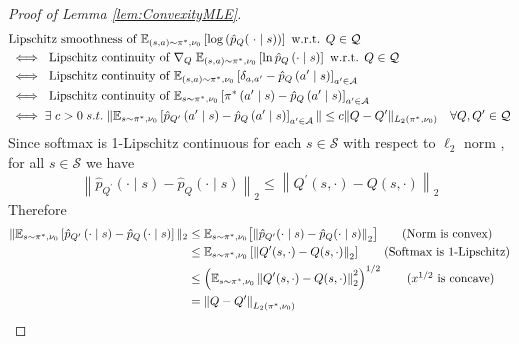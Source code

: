 \begin{proof}[Proof of Lemma \ref{lem:ConvexityMLE}]
\begin{align}
    &\text{Lipschitz} \text{ smoothness } \text{of }  \mathbb{E}_{(s, a)\sim \pi^*, \nu_0}  \left[\log\left(\hat{p}_{Q}(\;\cdot
    \mid s)\right)\right] \text{ w.r.t. }Q\in\mathcal{Q}\notag
    \\
    &\iff \text{ Lipschitz continuity of } \nabla_Q \; \mathbb{E}_{(s,a)\sim\pi^*, \nu_0}\left[\ln \hat{p}_{Q}\left( \cdot \mid s\right)\right] \text{ w.r.t. } Q\in\mathcal{Q} \notag
    \\
    &\iff \text{ Lipschitz continuity of } \mathbb{E}_{(s, a) \sim \pi^*, \nu_0}\left[\delta_{a, a^{\prime}}-\hat{p}_Q\left(a^{\prime} \mid s\right)\right]_{a^{\prime}\in\mathcal{A}} \notag
    \\
    &\iff \text{ Lipschitz continuity of } \mathbb{E}_{s \sim \pi^*, \nu_0}\left[\pi^*\left(a^{\prime}\mid s\right) -\hat{p}_Q\left(a^{\prime} \mid s\right)\right]_{a^{\prime}\in\mathcal{A}} \notag
    \\
    &\iff \exists \; c>0 \; s.t. \;  \|\mathbb{E}_{s \sim \pi^*, \nu_0}\left[\hat{p}_{Q^\prime}\left(a^{\prime}\mid s\right) -\hat{p}_Q\left(a^{\prime} \mid s\right)\right]_{a^{\prime}\in\mathcal{A}}\| \le c\|Q-Q^\prime\|_{L_2(\pi^\ast, \nu_0)} \quad \forall Q, Q^\prime \in\mathcal{Q} \notag
\end{align}
Since softmax is 1-Lipschitz continuous for each $s\in\mathcal{S}$ with respect to $\ell_2$ norm \cite{gao2017properties}, for all $s\in\mathcal{S}$ we have
$$
\left\|\hat{p}_{Q^{\prime}}(\cdot \mid s)-\hat{p}_Q(\cdot \mid s)\right\|_2 \leq \left\|Q^{\prime}(s, \cdot)-Q(s, \cdot)\right\|_2
$$
Therefore
\begin{align}
  \|\mathbb{E}_{s \sim \pi^*, \nu_0}\left[\hat{p}_{Q^\prime}\left(\cdot\mid s\right) -\hat{p}_Q\left(\cdot\mid s\right)\right]\|_2 & \leq \mathbb{E}_{s \sim \pi^*, \nu_0}\bigl[\left\|\hat{p}_{Q^{\prime}}(\cdot \mid s)-\hat{p}_Q(\cdot \mid s)\right\|_2\bigr] \tag {Norm is convex}
  \\
  &\leq \mathbb{E}_{s \sim \pi^*, \nu_0}\left[\left\|Q^{\prime}(s, \cdot)-Q(s, \cdot)\right\|_2\right] \tag{Softmax is 1-Lipschitz}
  \\
  &\leq\left(\mathbb{E}_{s \sim \pi^*, \nu_0}\left\|Q^{\prime}(s, \cdot)-Q(s, \cdot)\right\|_2^2\right)^{1 / 2} \tag{$x^{1/2}$ is concave}
  \\
  &=\left\|Q-Q^{\prime}\right\|_{L_2(\pi^\ast, \nu_0)} \notag
\end{align}



\end{proof}
